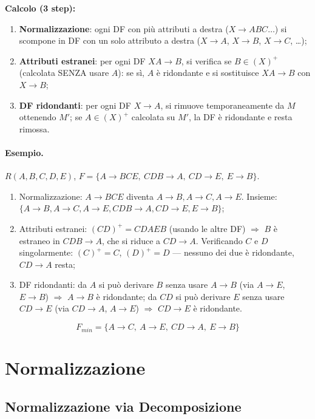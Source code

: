 \documentclass[12pt, a4paper]{article}
\begin{document}
\textbf{Calcolo (3 step):}
\begin{enumerate}
    \item \textbf{Normalizzazione}: ogni DF con più attributi a destra ($X\to ABC\ldots$) si scompone in DF con un solo attributo a destra ($X\to A$, $X\to B$, $X\to C$, \ldots);
    \item \textbf{Attributi estranei}: per ogni DF $XA \to B$, si verifica se $B \in (X)^+$ (calcolata SENZA usare $A$): se sì, $A$ è ridondante e si sostituisce $XA\to B$ con $X \to B$;
    \item \textbf{DF ridondanti}: per ogni DF $X \to A$, si rimuove temporaneamente da $M$ ottenendo $M'$; se $A \in (X)^+$ calcolata su $M'$, la DF è ridondante e resta rimossa.
\end{enumerate}

\paragraph{Esempio.} $R(A,B,C,D,E)$, $F = \{A\to BCE,\ CDB \to A,\ CD \to E,\ E \to B\}$.
\begin{enumerate}
    \item Normalizzazione: $A\to BCE$ diventa $A\to B, A\to C, A\to E$. Insieme: $\{A\to B, A\to C, A\to E, CDB\to A, CD\to E, E\to B\}$;
    \item Attributi estranei: $(CD)^+ = CDAEB$ (usando le altre DF) $\Rightarrow$ $B$ è estraneo in $CDB\to A$, che si riduce a $CD \to A$. Verificando $C$ e $D$ singolarmente: $(C)^+=C$, $(D)^+=D$ — nessuno dei due è ridondante, $CD\to A$ resta;
    \item DF ridondanti: da $A$ si può derivare $B$ senza usare $A\to B$ (via $A\to E$, $E\to B$) $\Rightarrow$ $A\to B$ è ridondante; da $CD$ si può derivare $E$ senza usare $CD\to E$ (via $CD\to A$, $A\to E$) $\Rightarrow$ $CD\to E$ è ridondante.
\end{enumerate}
$$F_{min} = \{A\to C,\ A\to E,\ CD\to A,\ E\to B\}$$







\section{Normalizzazione}

\subsection{Normalizzazione via Decomposizione}
\end{document}
